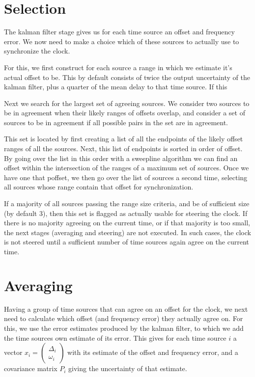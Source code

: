 \documentclass{article}
\begin{document}
\section{Selection}\label{sec:selection}

The kalman filter stage gives us for each time source an offset and frequency error.
We now need to make a choice which of these sources to actually use to synchronize the clock.

For this, we first construct for each source a range in which we estimate it's actual offset to be.
This by default consists of twice the output uncertainty of the kalman filter, plus a quarter of the mean delay to that time source.
If this 

Next we search for the largest set of agreeing sources. We consider two sources to be in agreement when their likely ranges of offsets overlap,
and consider a set of sources to be in agreement if all possible pairs in the set are in agreement.

This set is located by first creating a list of all the endpoints of the likely offset ranges of all the sources.
Next, this list of endpoints is sorted in order of offset.
By going over the list in this order with a sweepline algorithm we can find an offset within the intersection of the ranges of a maximum set of sources.
Once we have one that poffset, we then go over the list of sources a second time, selecting all sources whose range contain that offset for synchronization.

If a majority of all sources passing the range size criteria, and be of sufficient size (by default 3), then this set is flagged as actually usable for
steering the clock.
If there is no majority agreeing on the current time, or if that majority is too small, the next stages (averaging and steering) are not executed.
In such cases, the clock is not steered until a sufficient number of time sources again agree on the current time.

\section{Averaging}\label{sec:averaging}

Having a group of time sources that can agree on an offset for the clock, we next need to calculate which offset (and frequency error) they actually agree on.
For this, we use the error estimates produced by the kalman filter, to which we add the time sources own estimate of its error.
This gives for each time source $i$ a vector $x_i = \begin{pmatrix}\Delta_i\\\omega_i\end{pmatrix}$ with its estimate of the offset and frequency error,
and a covariance matrix $P_i$ giving the uncertainty of that estimate.
\end{document}
